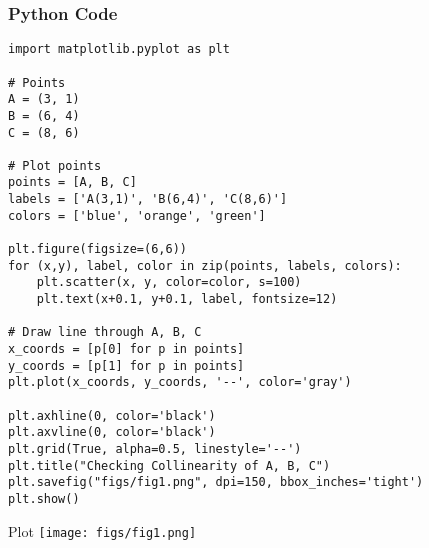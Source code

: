 \documentclass{beamer}
\begin{document}
\begin{frame}[fragile]
    \frametitle{Python Code}
    \begin{lstlisting}
import matplotlib.pyplot as plt

# Points
A = (3, 1)
B = (6, 4)
C = (8, 6)

# Plot points
points = [A, B, C]
labels = ['A(3,1)', 'B(6,4)', 'C(8,6)']
colors = ['blue', 'orange', 'green']

plt.figure(figsize=(6,6))
for (x,y), label, color in zip(points, labels, colors):
    plt.scatter(x, y, color=color, s=100)
    plt.text(x+0.1, y+0.1, label, fontsize=12)

# Draw line through A, B, C
x_coords = [p[0] for p in points]
y_coords = [p[1] for p in points]
plt.plot(x_coords, y_coords, '--', color='gray')

plt.axhline(0, color='black')
plt.axvline(0, color='black')
plt.grid(True, alpha=0.5, linestyle='--')
plt.title("Checking Collinearity of A, B, C")
plt.savefig("figs/fig1.png", dpi=150, bbox_inches='tight')
plt.show()
    \end{lstlisting}
\end{frame}

\begin{frame}{Plot}
   \centering
   \texttt{[image: figs/fig1.png]}
   \label{fig:Beamer/figs/fig1.png}
\end{frame}
\end{document}
